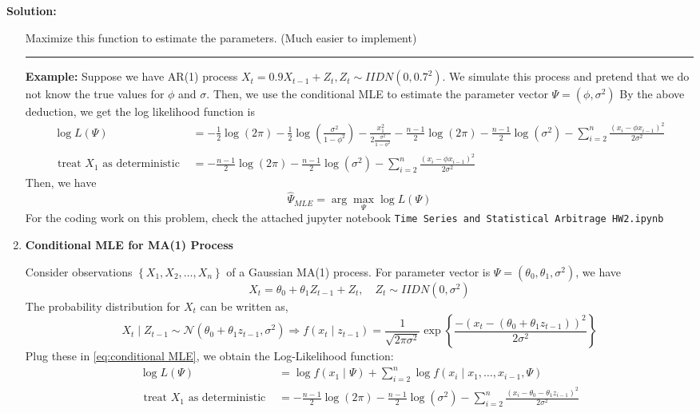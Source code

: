 \documentclass[11pt]{article}
\theoremstyle{plain} %
\newenvironment{solution}
{\color{C2}\normalfont\begin{framed}\begingroup\textbf{Solution:} }
  {\endgroup\end{framed}}
\theoremstyle{remark}
\begin{document}
\begin{solution}
\begin{enumerate}[label = (\alph*)]
          Maximize this function to estimate the parameters. (Much easier to implement)\\

          \hrule

          \textbf{Example:} Suppose we have AR(1) process $X_t=0.9X_{t-1}+Z_t, Z_t \sim IIDN\left(0,0.7^2\right)$. We simulate this process and pretend that we do not know the true values for $\phi$ and $\sigma$.
          Then, we use the conditional MLE to estimate the parameter vector $\Psi=\left(\phi, \sigma^2\right)$
          By the above deduction, we get the log likelihood function is
          \begin{align*}
            \log L(\Psi)                                 & =-\frac{1}{2} \log (2 \pi)-\frac{1}{2} \log \left(\frac{\sigma^2}{1-\phi^2}\right)-\frac{x_1^2}{2 \frac{\sigma^2}{1-\phi^2}}-\frac{n-1}{2} \log (2 \pi)-\frac{n-1}{2} \log \left(\sigma^2\right)-\sum_{i=2}^n \frac{\left(x_i-\phi x_{i-1}\right)^2}{2 \sigma^2} \\
            \text{ treat } X_1 \text{ as deterministic } & = -\frac{n-1}{2} \log (2 \pi)-\frac{n-1}{2} \log \left(\sigma^2\right)-\sum_{i=2}^n \frac{\left(x_i-\phi x_{i-1}\right)^2}{2 \sigma^2}
          \end{align*}
          Then, we have
          $$
            \hat{\Psi}_{MLE}=\arg \max_{\Psi} \log L(\Psi)
          $$
          For the coding work on this problem, check the attached jupyter notebook \texttt{Time Series and Statistical Arbitrage HW2.ipynb}
    \item \textbf{Conditional MLE for MA(1) Process}

          Consider observations $\left\{X_1, X_2, \ldots, X_n\right\}$ of a Gaussian
          MA(1) process. For parameter vector is $\Psi=\left(\theta_0, \theta_1, \sigma^2\right)$, we have
          $$
            X_t=\theta_0+\theta_1 Z_{t-1}+Z_t, \quad Z_t \sim IIDN\left(0, \sigma^2\right)
          $$
          The probability distribution for $X_t$ can be written as,
          $$
            X_t \mid Z_{t-1} \sim \mathcal{N}\left(\theta_0+\theta_1 z_{t-1}, \sigma^2\right) \Longrightarrow  f\left(x_t \mid z_{t-1}\right)=\frac{1}{\sqrt{2 \pi \sigma^2}} \exp \left\{\frac{-\left(x_t-\left(\theta_0+\theta_1 z_{t-1}\right)\right)^2}{2 \sigma^2}\right\}
          $$
          Plug these in \cref{eq:conditional MLE}, we obtain the Log-Likelihood function:
          \begin{align*}
            \log L(\Psi)                                 & = \log f(x_1 \mid \Psi) + \sum_{i=2}^{n} \log f(x_{i} \mid x_1, \ldots, x_{i-1}, \Psi)                                                              \\
            \text{ treat } X_1 \text{ as deterministic } & = -\frac{n-1}{2} \log (2 \pi)-\frac{n-1}{2} \log \left(\sigma^2\right)-\sum_{i=2}^n \frac{\left(x_i-\theta_0-\theta_1 z_{i-1}\right)^2}{2 \sigma^2}
          \end{align*}


\end{enumerate}
\end{solution}
\end{document}
